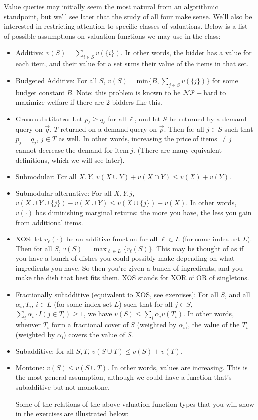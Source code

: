 \documentclass[12pt]{article}%
\begin{document}
Value queries may initially seem the most natural from an algorithmic standpoint, but we'll see later that the study of all four make sense. We'll also be interested in restricting attention to specific classes of valuations. Below is a list of possible assumptions on valuation functions we may use in the class:
\begin{itemize}
\item Additive: $v(S) = \sum_{i \in S} v(\{i\})$. In other words, the bidder has a value for each item, and their value for a set sums their value of the items in that set.
\item Budgeted Additive: For all $S$, $v(S) = \textrm{min}\{B,\sum_{j\in S}v(\{j\})\}$ for some budget constant $B$. Note: this problem is known to be $\mathcal{NP}-$hard to maximize welfare if there are 2 bidders like this.
\item Gross substitutes: Let $p_\ell \geq q_\ell$ for all $\ell$, and let $S$ be returned by a demand query on $\vec{q}$, $T$ returned on a demand query on $\vec{p}$.  Then for all $j \in S$ such that $p_j = q_j$, $j \in T$ as well. In other words, increasing the price of items $\neq j$ cannot decrease the demand for item $j$. (There are many equivalent definitions, which we will see later).
\item Submodular: For all $X, Y$, $v(X \cup Y) + v(X \cap Y) \leq v(X) + v(Y)$.
\item Submodular alternative: For all $X, Y,j$, $v(X \cup Y \cup \{j\})-v(X \cup Y) \leq v(X \cup \{j\}) - v(X)$. In other words, $v(\cdot)$ has diminishing marginal returns: the more you have, the less you gain from additional items.
\item XOS: let $v_\ell(\cdot)$ be an additive function for all $\ell \in L$ (for some index set $L$). Then for all $S$, $v(S) = \max_{\ell \in L} \{v_\ell(S)\}$. This may be thought of as if you have a bunch of dishes you could possibly make depending on what ingredients you have. So then you're given a bunch of ingredients, and you make the dish that best fits them. XOS stands for XOR of OR of singletons.
\item Fractionally subadditive (equivalent to XOS, see exercises): For all $S$, and all $\alpha_i, T_i$, $i \in L$ (for some index set $L$) such that for all $j \in S$, $\sum_i \alpha_i \cdot I(j \in T_i) \geq 1$, we have $v(S) \leq \sum_i \alpha_i v(T_i)$. In other words, whenver $T_i$ form a fractional cover of $S$ (weighted by $\alpha_i$), the value of the $T_i$ (weighted by $\alpha_i$) covers the value of $S$. 
\item Subadditive: for all $S, T$, $v(S \cup T) \leq v(S) + v(T)$.
\item Montone: $v(S) \leq v(S \cup T)$. In other words, values are increasing. This is the most general assumption, although we could have a function that's subadditive but not monotone.

Some of the relations of the above valuation function types that you will show in the exercises are illustrated below:
\end{itemize}
\end{document}

